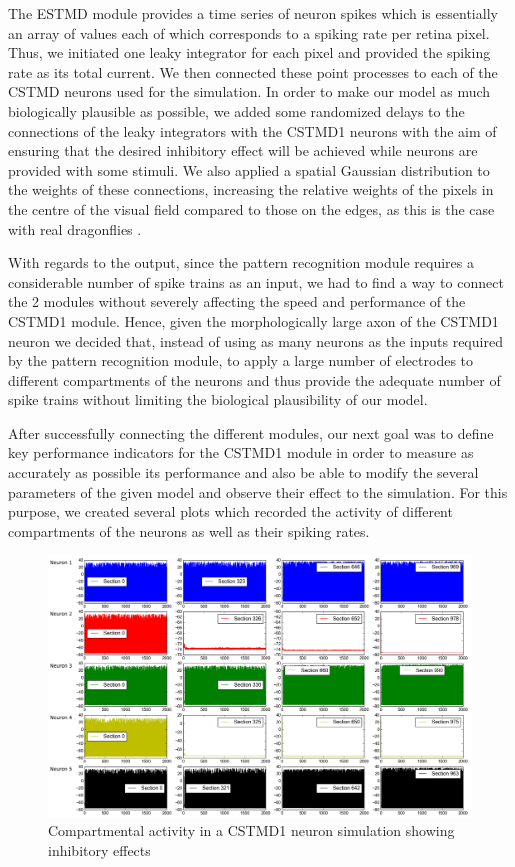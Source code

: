 \documentclass[a4paper,11pt]{article}
\begin{document}
The ESTMD module provides a time series of neuron spikes which is essentially an array of values each of which corresponds to a spiking rate per retina pixel. Thus, we initiated one leaky integrator for each pixel and provided the spiking rate as its total current. We then connected these point processes to each of the CSTMD neurons used for the simulation. In order to make our model as much biologically plausible as possible, we added some randomized delays to the connections of the leaky integrators with the CSTMD1 neurons with the aim of ensuring that the desired inhibitory effect will be achieved while neurons are provided with some stimuli. We also applied a spatial Gaussian distribution to the weights of these connections, increasing the relative weights of the pixels in the centre of the visual field compared to those on the edges, as this is the case with real dragonflies \cite{w13}.

With regards to the output, since the pattern recognition module requires a considerable number of spike trains as an input, we had to find a way to connect the 2 modules without severely affecting the speed and performance of the CSTMD1 module. Hence, given the morphologically large axon of the CSTMD1 neuron \cite{geurten} we decided that, instead of using as many neurons as the inputs required by the pattern recognition module, to apply a large number of electrodes to different compartments of the neurons and thus provide the adequate number of spike trains without limiting the biological plausibility of our model.

After successfully connecting the different modules, our next goal was to define key performance indicators for the CSTMD1 module in order to measure as accurately as possible its performance and also be able to modify the several parameters of the given model and observe their effect to the simulation. For this purpose, we created several plots which recorded the activity of different compartments of the neurons as well as their spiking rates. 


\begin{figure}[h]
\centering
\includegraphics[scale = 0.3]{compartments}
\caption{Compartmental activity in a CSTMD1 neuron simulation showing inhibitory effects}
\end{figure}
\end{document}
